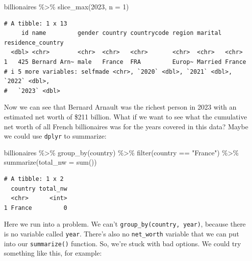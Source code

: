 \documentclass[
  letterpaper,
]{book}
\newenvironment{Shaded}{\begin{snugshade}}{\end{snugshade}}
\newcommand{\AttributeTok}[1]{\textcolor[rgb]{0.40,0.45,0.13}{#1}}
\newcommand{\DecValTok}[1]{\textcolor[rgb]{0.68,0.00,0.00}{#1}}
\newcommand{\FunctionTok}[1]{\textcolor[rgb]{0.28,0.35,0.67}{#1}}
\newcommand{\NormalTok}[1]{\textcolor[rgb]{0.00,0.23,0.31}{#1}}
\newcommand{\SpecialCharTok}[1]{\textcolor[rgb]{0.37,0.37,0.37}{#1}}
\newcommand{\StringTok}[1]{\textcolor[rgb]{0.13,0.47,0.30}{#1}}
\begin{document}
\begin{Shaded}
\begin{Highlighting}[]
\NormalTok{billionaires }\SpecialCharTok{\%\textgreater{}\%}
  \FunctionTok{slice\_max}\NormalTok{(}\StringTok{\textasciigrave{}}\AttributeTok{2023}\StringTok{\textasciigrave{}}\NormalTok{, }\AttributeTok{n =} \DecValTok{1}\NormalTok{)}
\end{Highlighting}
\end{Shaded}

\begin{verbatim}
# A tibble: 1 x 13
     id name         gender country countrycode region marital residence_country
  <dbl> <chr>        <chr>  <chr>   <chr>       <chr>  <chr>   <chr>            
1   425 Bernard Arn~ male   France  FRA         Europ~ Married France           
# i 5 more variables: selfmade <chr>, `2020` <dbl>, `2021` <dbl>, `2022` <dbl>,
#   `2023` <dbl>
\end{verbatim}

Now we can see that Bernard Arnault was the richest person in 2023 with
an estimated net worth of \$211 billion. What if we want to see what the
cumulative net worth of all French billionaires was for the years
covered in this data? Maybe we could use \texttt{dplyr} to summarize:

\begin{Shaded}
\begin{Highlighting}[]
\NormalTok{billionaires }\SpecialCharTok{\%\textgreater{}\%}
  \FunctionTok{group\_by}\NormalTok{(country) }\SpecialCharTok{\%\textgreater{}\%}
  \FunctionTok{filter}\NormalTok{(country }\SpecialCharTok{==} \StringTok{"France"}\NormalTok{) }\SpecialCharTok{\%\textgreater{}\%}
  \FunctionTok{summarize}\NormalTok{(}\AttributeTok{total\_nw =} \FunctionTok{sum}\NormalTok{())}
\end{Highlighting}
\end{Shaded}

\begin{verbatim}
# A tibble: 1 x 2
  country total_nw
  <chr>      <int>
1 France         0
\end{verbatim}

Here we run into a problem. We can't \texttt{group\_by(country,\ year)},
because there is no variable called \texttt{year}. There's also no
\texttt{net\_worth} variable that we can put into our
\texttt{summarize()} function. So, we're stuck with bad options. We
could try something like this, for example:
\end{document}

